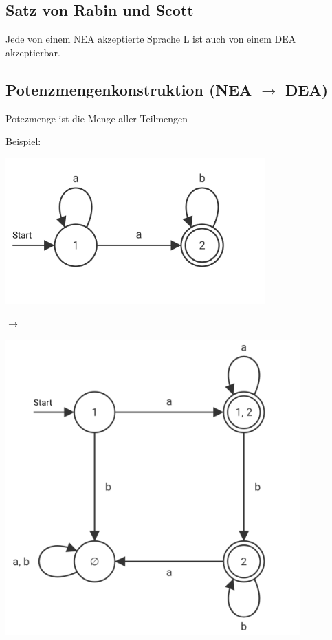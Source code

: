 \documentclass[11pt, a4paper]{scrartcl}
\begin{document}
\subsection{Satz von Rabin und Scott}

Jede von einem NEA akzeptierte Sprache L ist auch von einem DEA akzeptierbar.

\subsection{Potenzmengenkonstruktion (NEA $\rightarrow$ DEA)}

Potezmenge ist die Menge aller Teilmengen



\vspace{2em}

Beispiel:

\vspace{0.5em}

\begin{minipage}[h]{0.40\textwidth}
    \centering \includegraphics[width=0.75\textwidth]{NEA-01.png}
\end{minipage}
\begin{minipage}[h]{0.10\textwidth}
    \centering $\rightarrow$
\end{minipage}
\begin{minipage}[h]{0.40\textwidth}
    \centering \includegraphics[width=0.85\textwidth]{DEA-01.png}
\end{minipage}
\end{document}
